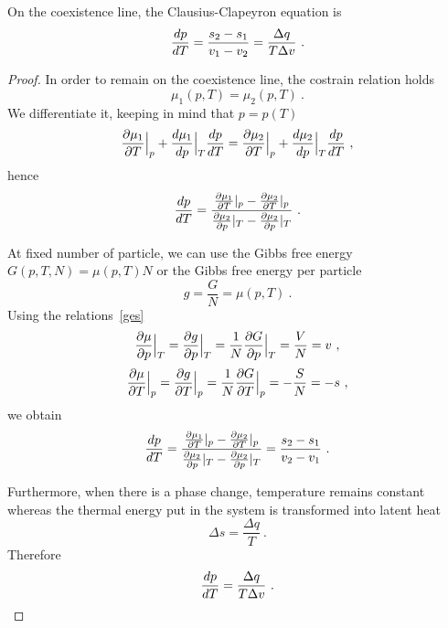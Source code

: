     On the coexistence line, the Clausius-Clapeyron equation is 
    \begin{equation*}
        \frac{dp}{dT} = \frac{s_2 - s_1}{v_1 - v_2} = \frac{\Delta q}{T \Delta v}  ~.
    \end{equation*}
    \begin{proof}
        In order to remain on the coexistence line, the costrain relation holds
        \begin{equation*}
            \mu_1(p, T) = \mu_2 (p, T) ~.
        \end{equation*}
        We differentiate it, keeping in mind that $p = p(T)$
        \begin{equation*}
            \frac{\partial\mu_1}{\partial T} \Big \vert_p + \frac{d\mu_1}{dp} \Big \vert_T \frac{dp}{dT} = \frac{\partial\mu_2}{\partial T} \Big \vert_p + \frac{d\mu_2}{dp} \Big \vert_T \frac{dp}{dT} ~,
        \end{equation*}
        hence 
        \begin{equation*}
            \frac{dp}{dT} = \frac{\frac{\partial\mu_1}{\partial T} \vert_p - \frac{\partial\mu_2}{\partial T} \vert_p}{\frac{\partial\mu_2}{\partial p} \vert_T - \frac{\partial\mu_2}{\partial p} \vert_T} ~.
        \end{equation*}

        At fixed number of particle, we can use the Gibbs free energy $G(p, T, N) = \mu (p, T) N$ or the Gibbs free energy per particle 
        \begin{equation*}
            g = \frac{G}{N} = \mu(p,T) ~.
        \end{equation*}
        Using the relations~\eqref{ges}
        \begin{equation*}
            \frac{\partial\mu}{\partial p} \Big \vert_T = \frac{\partial g}{\partial p} \Big \vert_T = \frac{1}{N} \frac{\partial G}{\partial p} \Big \vert_T = \frac{V}{N} = v ~,
        \end{equation*}
        \begin{equation*}
            \frac{\partial\mu}{\partial T} \Big \vert_p = \frac{\partial g}{\partial T} \Big \vert_p = \frac{1}{N} \frac{\partial G}{\partial T} \Big \vert_p = - \frac{S}{N} = - s ~,
        \end{equation*}
        we obtain
        \begin{equation*}
            \frac{dp}{dT} = \frac{\frac{\partial\mu_1}{\partial T} \vert_p - \frac{\partial\mu_2}{\partial T} \vert_p}{\frac{\partial\mu_2}{\partial p} \vert_T - \frac{\partial\mu_2}{\partial p} \vert_T} = \frac{s_2 - s_1}{v_2 - v_1} ~.
        \end{equation*}

        Furthermore, when there is a phase change, temperature remains constant whereas the thermal energy put in the system is transformed into latent heat
        \begin{equation*}
            \Delta s = \frac{\Delta q}{T} ~.
        \end{equation*}
        Therefore
        \begin{equation*}
            \frac{dp}{dT} = \frac{\Delta q}{T \Delta v} ~.
        \end{equation*}
    \end{proof}



